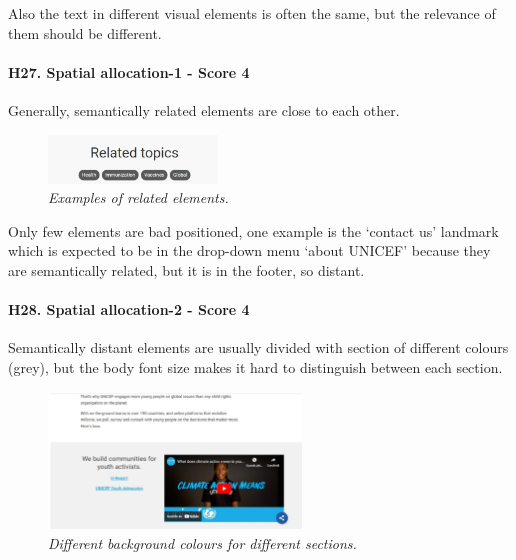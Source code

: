 \newline Also the text in different visual elements is often the same, but the relevance of them should be different.
\newline
\newline \paragraph{H27. Spatial allocation-1 - Score 4}	Generally, semantically related elements are close to each other.
\begin{figure}[!h]
	\begin{center}
		\includegraphics[width=0.4\textwidth]{FinalScores30.jpg}
		\captionsetup{font=small}
		\caption{\textit{Examples of related elements.}}
	\end{center}
\end{figure}
\newline Only few elements are bad positioned, one example is the ‘contact us’ landmark which is expected to be in the drop-down menu ‘about UNICEF’ because they are semantically related, but it is in the footer, so distant.
\newline
\newline \paragraph{H28. Spatial allocation-2 - Score 4}	Semantically distant elements are usually divided with section of different colours (grey), but the body font size makes it hard to distinguish between each section. 
\begin{figure}[!h]
	\begin{center}
		\includegraphics[width=0.6\textwidth]{FinalScores31.jpg}
		\captionsetup{font=small}
		\caption{\textit{Different background colours for different sections.}}
	\end{center}
\end{figure}
